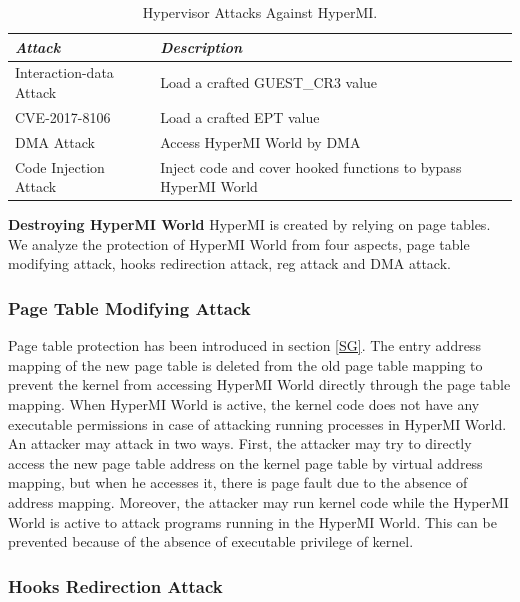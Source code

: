 \documentclass[conference]{IEEEtran}
\begin{document}
\begin{table}
\centering
\caption{Hypervisor Attacks Against HyperMI.}\label{tab3}
\begin{tabular}{p{2.8cm}|p{5.5cm}}
\hline
{\itshape\bfseries Attack} & {\itshape\bfseries Description} \\
\hline
Interaction-data Attack & Load a crafted GUEST\_CR3 value\\
\hline
CVE-2017-8106 & Load a crafted EPT value \\
\hline
DMA Attack & Access HyperMI World by DMA \\
\hline
Code Injection Attack & Inject code and cover hooked functions to bypass HyperMI World \\
\hline
\end{tabular}
\end{table}

\textbf{Destroying HyperMI World}
HyperMI is created by relying on page tables.
We analyze the protection of HyperMI World from four aspects, page table modifying attack, hooks redirection attack, reg attack and DMA attack.


\subsubsection{Page Table Modifying Attack}

Page table protection has been introduced in section \ref{SG}. The entry address mapping of the new page table is deleted from the old page table mapping to prevent the kernel from accessing HyperMI World directly through the page table mapping. When HyperMI World is active, the kernel code does not have any executable permissions in case of attacking running processes in HyperMI World. An attacker may attack in two ways.
First, the attacker may try to directly access the new page table address on the kernel page table by virtual address mapping, but when he accesses it, there is page fault due to the absence of address mapping.
Moreover, the attacker may run kernel code while the HyperMI World is active to attack programs running in the HyperMI World. This can be prevented because of the absence of executable privilege of kernel.



\subsubsection{Hooks Redirection Attack}
\end{document}
